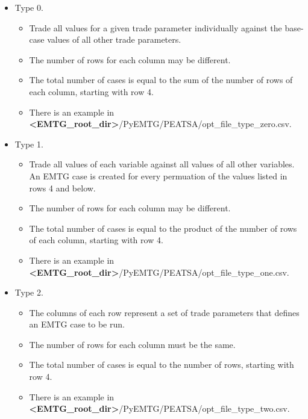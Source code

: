 \begin{itemize}
	\item Type 0.
	\begin{itemize}
		\item Trade all values for a given trade parameter individually against the base-case values of all other trade parameters.
		\item The number of rows for each column may be different.
		\item The total number of cases is equal to the sum of the number of rows of each column, starting with row 4.
		\item There is an example in \textbf{\textless EMTG\_root\_dir\textgreater}/PyEMTG/PEATSA/opt\_file\_type\_zero.csv.
	\end{itemize}
	\item Type 1.
	\begin{itemize}
		\item Trade all values of each variable against all values of all other variables. An \ac{EMTG} case is created for every permuation of the values listed in rows 4 and below.
		\item The number of rows for each column may be different.
		\item The total number of cases is equal to the product of the number of rows of each column, starting with row 4.
		\item There is an example in \textbf{\textless EMTG\_root\_dir\textgreater}/PyEMTG/PEATSA/opt\_file\_type\_one.csv.
	\end{itemize}
	\item Type 2.
	\begin{itemize}
		\item The columns of each row represent a set of trade parameters that defines an \ac{EMTG} case to be run.
		\item The number of rows for each column must be the same.
		\item The total number of cases is equal to the number of rows, starting with row 4.
		\item There is an example in \textbf{\textless EMTG\_root\_dir\textgreater}/PyEMTG/PEATSA/opt\_file\_type\_two.csv.
	\end{itemize}
\end{itemize}